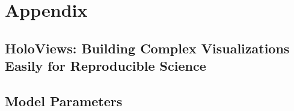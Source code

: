 \chapter{Appendix}

\section{HoloViews: Building Complex Visualizations Easily for Reproducible Science} \label{SciPyPaper}



\section{Model Parameters} \label{Appendix:Parameters}

